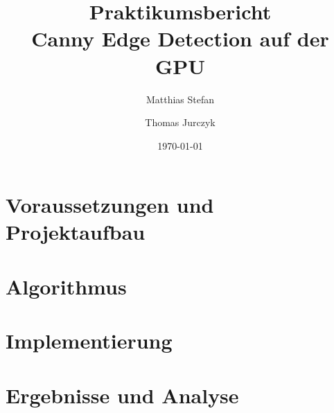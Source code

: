 \documentclass[12pt,a4paper]{article}
\title{\textbf{Praktikumsbericht} \\[0.5em]
\large Canny Edge Detection auf der GPU}
\author{Matthias Stefan \and Thomas Jurczyk}
\date{\today}
\begin{document}
    \maketitle
    \tableofcontents
    \newpage

    \section{Voraussetzungen und Projektaufbau}
    \label{sec:voraussetzungen-und-projektaufbau}
    
    
    
    
    
    
    \newpage


    \section{Algorithmus}
    \label{sec:algorithmus}
    
    
    \newpage


    \section{Implementierung}
    \label{sec:implementierung}
    
    
    
    
    \newpage


    \section{Ergebnisse und Analyse}
    \label{sec:ergebnisse-und-analyse}
    
    
    
    
    
    \newpage
\end{document}
